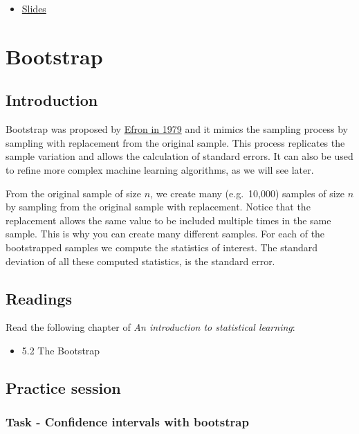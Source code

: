 \documentclass[
]{book}
\providecommand{\tightlist}{%
  \setlength{\itemsep}{0pt}\setlength{\parskip}{0pt}}
\begin{document}
\begin{itemize}
\tightlist
\item
  \href{https://www.dropbox.com/s/wbwlcxwxnyf4bvi/Module-3-Resampling-methods_2020.pdf?dl=0}{Slides}
\end{itemize}

\chapter{Bootstrap}\label{bootstrap}

\section{Introduction}\label{boot.intro}

Bootstrap was proposed by
\href{https://projecteuclid.org/download/pdf_1/euclid.aos/1176344552}{Efron in 1979}
and it mimics the sampling process by sampling with replacement from
the original sample. This process replicates the sample variation and allows
the calculation of standard errors. It can also be used to refine more
complex machine learning algorithms, as we will see later.

From the original sample of size \(n\), we create many (e.g.~10,000) samples of
size \(n\) by sampling from the original sample with replacement. Notice that the replacement
allows the same value to be included multiple times in the same sample. This
is why you can create many different samples.
For each of the bootstrapped samples we compute the statistics of interest. The
standard deviation of all these computed statistics, is the standard error.

\section{Readings}\label{boot.read}

Read the following chapter of \emph{An introduction to statistical learning}:

\begin{itemize}
\tightlist
\item
  5.2 The Bootstrap
\end{itemize}

\section{Practice session}\label{boot.prac}

\subsection*{Task - Confidence intervals with bootstrap}\label{task---confidence-intervals-with-bootstrap}
\end{document}
